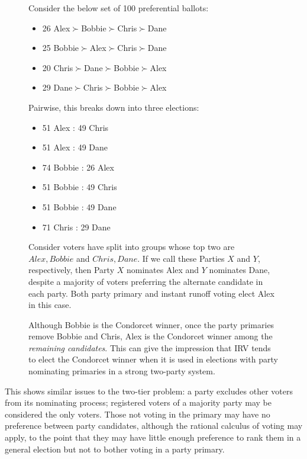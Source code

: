 \begin{figure}
    \begin{election}
        \singlespacing
        \label{ele:party-primary}
        Consider the below set of 100 preferential ballots:
        \begin{itemize}
            \item 26 Alex$\succ$Bobbie$\succ$Chris$\succ$Dane
            \item 25 Bobbie$\succ$Alex$\succ$Chris$\succ$Dane
            \item 20 Chris$\succ$Dane$\succ$Bobbie$\succ$Alex
            \item 29 Dane$\succ$Chris$\succ$Bobbie$\succ$Alex
        \end{itemize}

        Pairwise, this breaks down into three elections:

        \begin{itemize}
            \item 51 Alex : 49 Chris
            \item 51 Alex : 49 Dane
            \item 74 Bobbie : 26 Alex
            \item 51 Bobbie : 49 Chris
            \item 51 Bobbie : 49 Dane
            \item 71 Chris : 29 Dane
        \end{itemize}
        Consider voters have split into groups whose top two are ${Alex,Bobbie}$ and ${Chris,Dane}$.  If we call these Parties $X$ and $Y$, respectively, then Party $X$ nominates Alex and $Y$ nominates Dane, despite a majority of voters preferring the alternate candidate in each party.  Both party primary and instant runoff voting elect Alex in this case.

        Although Bobbie is the Condorcet winner, once the party primaries remove Bobbie and Chris, Alex is the Condorcet winner among the \textit{remaining candidates}.  This can give the impression that IRV tends to elect the Condorcet winner when it is used in elections with party nominating primaries in a strong two-party system.
    \end{election}
\end{figure}

This shows similar issues to the two-tier problem:  a party excludes other voters from its nominating process; registered voters of a majority party may be considered the only voters.  Those not voting in the primary may have no preference between party candidates, although the rational calculus of voting may apply, to the point that they may have little enough preference to rank them in a general election but not to bother voting in a party primary.

